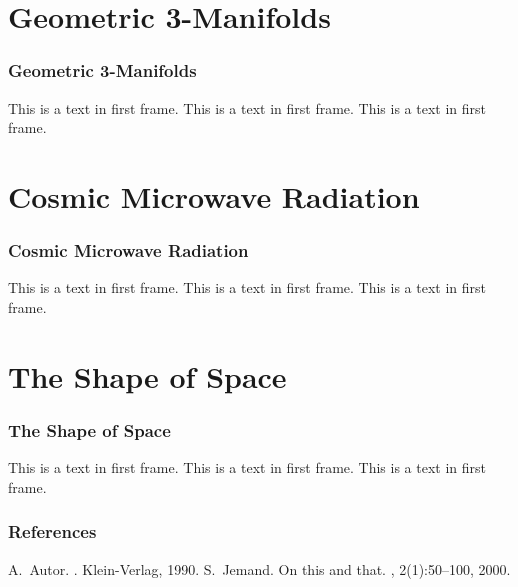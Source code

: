 \documentclass[13pt]{beamer}
\begin{document}
\section{Geometric 3-Manifolds} %
\begin{frame}
\frametitle{Geometric 3-Manifolds}
This is a text in first frame. This is a text in first frame. This is a text in first frame.
\end{frame}

\section{Cosmic Microwave Radiation} %
\begin{frame}
\frametitle{Cosmic Microwave Radiation}
This is a text in first frame. This is a text in first frame. This is a text in first frame.
\end{frame}

\section{The Shape of Space} %
\begin{frame}
\frametitle{The Shape of Space}
This is a text in first frame. This is a text in first frame. This is a text in first frame.
\end{frame}

 \begin{frame}[allowframebreaks]
  \frametitle{References}    
  \begin{thebibliography}{10}    
  \beamertemplatebookbibitems
    A.~Autor.
    .
    \newblock Klein-Verlag, 1990.
  \beamertemplatearticlebibitems
    S.~Jemand.
    \newblock On this and that.
    , 2(1):50--100, 2000.
  \end{thebibliography}
\end{frame}
\end{document}
